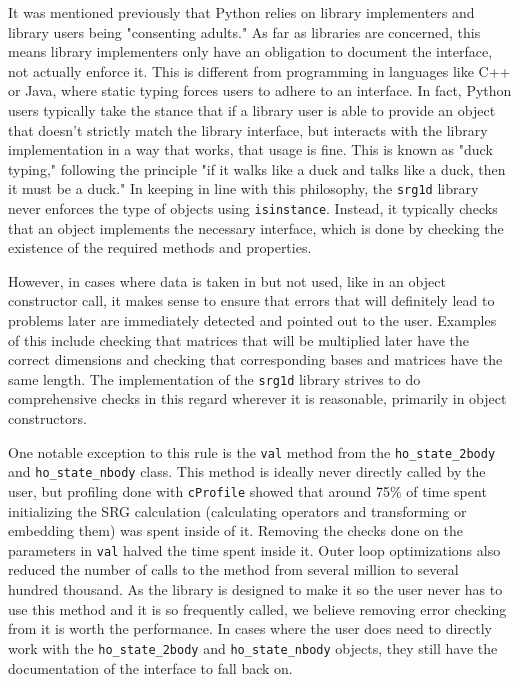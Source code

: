It was mentioned previously that Python relies on library implementers and library users being "consenting adults." As far as libraries are concerned, this means library implementers only have an obligation to document the interface, not actually enforce it. This is different from programming in languages like C++ or Java, where static typing forces users to adhere to an interface. In fact, Python users typically take the stance that if a library user is able to provide an object that doesn't strictly match the library interface, but interacts with the library implementation in a way that works, that usage is fine. This is known as "duck typing," following the principle "if it walks like a duck and talks like a duck, then it must be a duck." In keeping in line with this philosophy, the \texttt{srg1d} library never enforces the type of objects using \texttt{isinstance}. Instead, it typically checks that an object implements the necessary interface, which is done by checking the existence of the required methods and properties.

However, in cases where data is taken in but not used, like in an object constructor call, it makes sense to ensure that errors that will definitely lead to problems later are immediately detected and pointed out to the user. Examples of this include checking that matrices that will be multiplied later have the correct dimensions and checking that corresponding bases and matrices have the same length. The implementation of the \texttt{srg1d} library strives to do comprehensive checks in this regard wherever it is reasonable, primarily in object constructors.

One notable exception to this rule is the \texttt{val} method from the \texttt{ho\_state\_2body} and \texttt{ho\_state\_nbody} class. This method is ideally never directly called by the user, but profiling done with \texttt{cProfile} showed that around 75\% of time spent initializing the SRG calculation (calculating operators and transforming or embedding them) was spent inside of it. Removing the checks done on the parameters in \texttt{val} halved the time spent inside it. Outer loop optimizations also reduced the number of calls to the method from several million to several hundred thousand. As the library is designed to make it so the user never has to use this method and it is so frequently called, we believe removing error checking from it is worth the performance. In cases where the user does need to directly work with the \texttt{ho\_state\_2body} and \texttt{ho\_state\_nbody} objects, they still have the documentation of the interface to fall back on.

